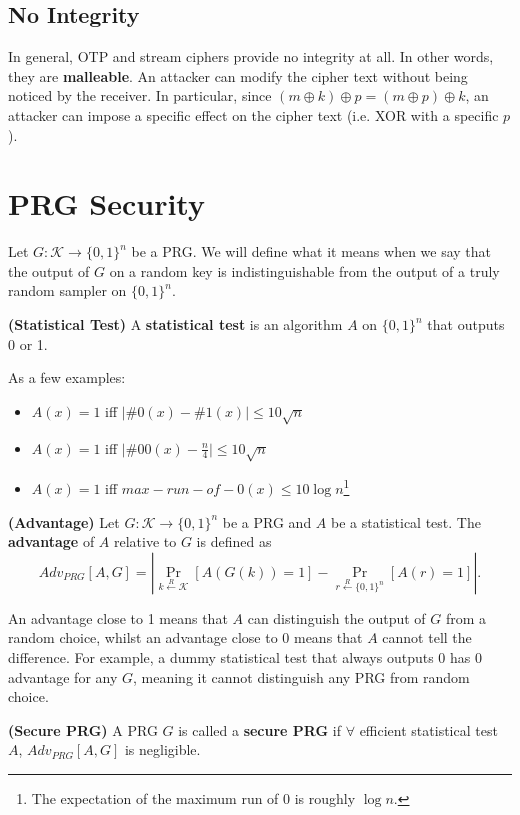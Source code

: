 \subsection{No Integrity}
In general, OTP and stream ciphers provide no integrity at all. In other words, they are \textbf{malleable}. An attacker can modify the cipher text without being noticed by the receiver. In particular, since $(m\oplus k)\oplus p=(m\oplus p)\oplus k$, an attacker can impose a specific effect on the cipher text (i.e. XOR with a specific $p$).
\section{PRG Security}
Let $G:\mathcal{K}\rightarrow\{0,1\}^n$ be a PRG. We will define what it means when we say that the output of $G$ on a random key is indistinguishable from the output of a truly random sampler on $\{0,1\}^n$.
\begin{definition}\textbf{(Statistical Test)}
A \textbf{statistical test} is an algorithm $A$ on $\{0,1\}^n$ that outputs 0 or 1. 
\end{definition}
As a few examples:
\begin{itemize}
\item $A(x)=1$ iff $\lvert\#0(x)-\#1(x)\rvert\leq 10\sqrt{n}$
\item $A(x)=1$ iff $\lvert\#00(x)-\frac{n}{4}\rvert\leq 10\sqrt{n}$
\item $A(x)=1$ iff $max-run-of-0(x)\leq 10\log{n}$\footnote{The expectation of the maximum run of 0 is roughly $\log n$.}
\end{itemize}
\begin{definition}\textbf{(Advantage)}
Let $G:\mathcal{K}\rightarrow\{0,1\}^n$ be a PRG and $A$ be a statistical test. The \textbf{advantage} of $A$ relative to $G$ is defined as 
\[Adv_{PRG}[A,G]=\left\lvert\mathop{Pr}\limits_{k\xleftarrow{R}\mathcal{K}}[A(G(k))=1]-\mathop{Pr}\limits_{r\xleftarrow{R}\{0,1\}^n}[A(r)=1]\right\rvert.\]
\end{definition}
An advantage close to 1 means that $A$ can distinguish the output of $G$ from a random choice, whilst an advantage close to 0 means that $A$ cannot tell the difference. For example, a dummy statistical test that always outputs 0 has 0 advantage for any $G$, meaning it cannot distinguish any PRG from random choice.
\begin{definition}\textbf{(Secure PRG)}
A PRG $G$ is called a \textbf{secure PRG} if $\forall$ efficient statistical test $A$, $Adv_{PRG}[A,G]$ is negligible.
\end{definition}
